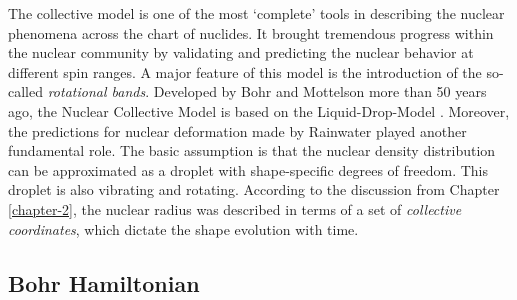 The collective model is one of the most `complete' tools in describing the nuclear phenomena across the chart of nuclides. It brought tremendous progress within the nuclear community by validating and predicting the nuclear behavior at different spin ranges. A major feature of this model is the introduction of the so-called \emph{rotational bands}. Developed by Bohr and Mottelson \cite{bohr1953collective,bohr1998nuclear} more than 50 years ago, the Nuclear Collective Model is based on the Liquid-Drop-Model \cite{meitner1939disintegration,bohr1939mechanism,myers1974nuclear}. Moreover, the predictions for nuclear deformation made by Rainwater \cite{rainwater1950nuclear} played another fundamental role. The basic assumption is that the nuclear density distribution can be approximated as a droplet with shape-specific degrees of freedom. This droplet is also vibrating and rotating. According to the discussion from Chapter \ref{chapter-2}, the nuclear radius was described in terms of a set of \emph{collective coordinates}, which dictate the shape evolution with time.

\subsection{Bohr Hamiltonian}

